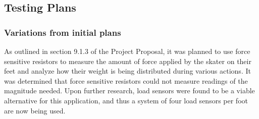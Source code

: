 \subsection{Testing Plans}

\subsubsection{Variations from initial plans}
As outlined in section 9.1.3 of the Project Proposal, it was planned to use force sensitive resistors to measure the amount of force applied by the skater on their feet and analyze how their weight is being distributed during various actions. It was determined that force sensitive resistors could not measure readings of the magnitude needed. Upon further research, load sensors were found to be a viable alternative for this application, and thus a system of four load sensors per foot are now being used.


